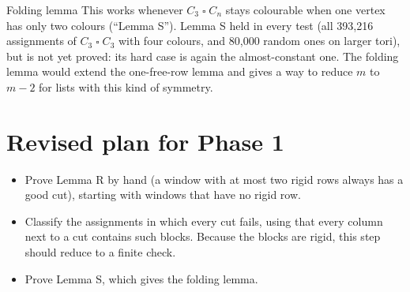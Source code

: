 \documentclass[11pt,oneside,openany]{book}
\newcommand{\T}{\mathbin{\square}}
\begin{document}
\begin{center}
\end{center}

\begin{partialbox}{Folding lemma}
This works whenever $C_3 \T C_n$ stays colourable when one vertex has only two colours
(``Lemma S''). Lemma S held in every test (all 393,216 assignments of $C_3 \T C_3$ with four
colours, and 80,000 random ones on larger tori), but is not yet proved: its hard case is again the
almost-constant one. The folding lemma would extend the one-free-row lemma and gives a way to
reduce $m$ to $m-2$ for lists with this kind of symmetry.
\end{partialbox}

\section{Revised plan for Phase 1}

\begin{itemize}
\item Prove Lemma R by hand (a window with at most two rigid rows always has a good cut),
starting with windows that have no rigid row.
\item Classify the assignments in which every cut fails, using that every column next to a cut
contains such blocks. Because the blocks are rigid, this step should reduce to a finite check.
\item Prove Lemma S, which gives the folding lemma.
\end{itemize}
\end{document}
